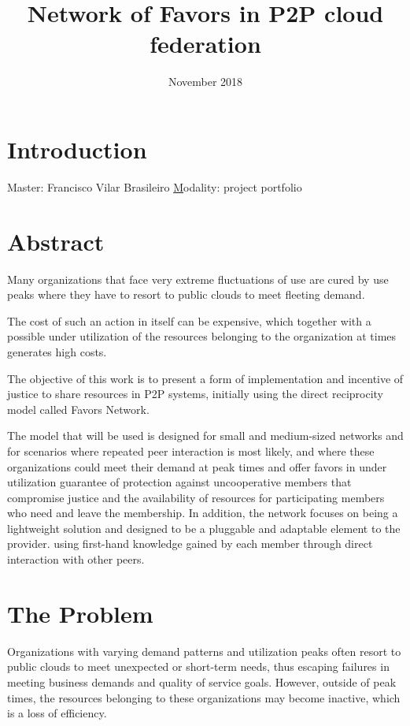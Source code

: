 \documentclass{article}
\title{Network of Favors in P2P cloud federation}
\author{Gustavo Diniz Monteiro \\ \href{gustavo.monteiro@ccc.ufcg.edu.br, gustavo.d.monteiro@icloud.com} }
\date{November 2018}
\begin{document}
\maketitle

\section{Introduction}

Master: Francisco Vilar Brasileiro \href{fubica@computacao.ufcg.edu.br}

Modality: project portfolio

\section{Abstract}
Many organizations that face very extreme fluctuations of use are cured by use peaks where they have to resort to public clouds to meet fleeting demand.

The cost of such an action in itself can be expensive, which together with a possible under utilization of the resources belonging to the organization at times generates high costs.

The objective of this work is to present a form of implementation and incentive of justice to share resources in P2P systems, initially using the direct reciprocity model called Favors Network.

The model that will be used is designed for small and medium-sized networks and for scenarios where repeated peer interaction is most likely, and where these organizations could meet their demand at peak times and offer favors in under utilization guarantee of protection against uncooperative members that compromise justice and the availability of resources for participating members who need and leave the membership. In addition, the network focuses on being a lightweight solution and designed to be a pluggable and adaptable element to the provider. using first-hand knowledge gained by each member through direct interaction with other peers.

\section{The Problem}
Organizations with varying demand patterns and utilization peaks often resort to public clouds to meet unexpected or short-term needs, thus escaping failures in meeting business demands and quality of service goals.
However, outside of peak times, the resources belonging to these organizations may become inactive, which is a loss of efficiency.
\end{document}
